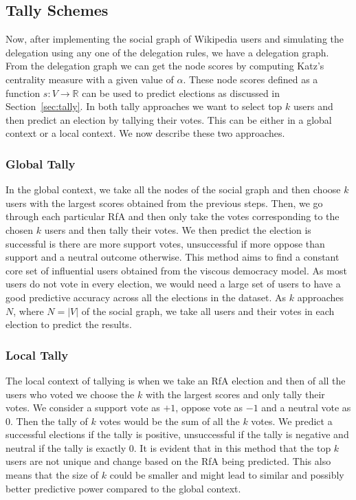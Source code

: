 \subsection{Tally Schemes}
Now, after implementing the social graph of Wikipedia users and simulating the delegation using any one of the delegation rules, we have a delegation graph. From the delegation graph we can get the node scores by computing Katz's centrality measure with a given value of $\alpha$. These node scores defined as a function $s:V\rightarrow \mathbb{R}$ can be used to predict elections as discussed in Section~\ref{sec:tally}. In both tally approaches we want to select top $k$ users and then predict an election by tallying their votes. This can be either in a global context or a local context. We now describe these two approaches.
\subsubsection{Global Tally}
In the global context, we take all the nodes of the social graph and then choose $k$ users with the largest scores obtained from the previous steps. Then, we go through each particular RfA and then only take the votes corresponding to the chosen $k$ users and then tally their votes. We then predict the election is successful is there are more support votes, unsuccessful if more oppose than support and a neutral outcome otherwise. This method aims to find a constant core set of influential users obtained from the viscous democracy model. As most users do not vote in every election, we would need a large set of users to have a good predictive accuracy across all the elections in the dataset. As $k$ approaches $N$, where $N= |V|$ of the social graph, we take all users and their votes in each election to predict the results. 
\subsubsection{Local Tally}
The local context of tallying is when we take an RfA election and then of all the users who voted we choose the $k$ with the largest scores and only tally their votes. We consider a support vote as $+1$, oppose vote as $-1$ and a neutral vote as $0$. Then the tally of $k$ votes would be the sum of all the $k$ votes. We predict a successful elections if the tally is positive, unsuccessful if the tally is negative and neutral if the tally is exactly 0. It is evident that in this method that the top $k$ users are not unique and change based on the RfA being predicted. This also means that the size of $k$ could be smaller and might lead to similar and possibly better predictive power compared to the global context.

